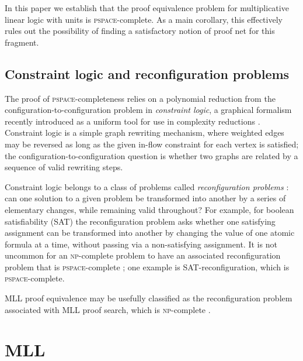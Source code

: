 \documentclass[conference]{IEEEtran}
\begin{document}
In this paper we establish that the proof equivalence problem for multiplicative linear logic with units is \textsc{pspace}-complete.
%
As a main corollary, this effectively rules out the possibility of finding a satisfactory notion of proof net for this fragment.



\subsection*{Constraint logic and reconfiguration problems}

The proof of \textsc{pspace}-completeness relies on a polynomial reduction from the configuration-to-configuration problem in
\emph{constraint logic}, a graphical formalism recently introduced as a uniform tool for use in complexity reductions \cite{Demaine-Hearn-2008}.
%
Constraint logic is a simple graph rewriting mechanism, where weighted edges may be reversed as long as the given in-flow constraint for each vertex is satisfied; the configuration-to-configuration question is whether two graphs are related by a sequence of valid rewriting steps.

Constraint logic belongs to a class of problems called \emph{reconfiguration problems} \cite{ReconfigurationProblems}: can one solution to a given problem be transformed into another by a series of elementary changes, while remaining valid throughout?
%
For example, for boolean satisfiability (SAT) the reconfiguration problem asks whether one satisfying assignment can be transformed into another by changing the value of one atomic formula at a time, without passing via a non-satisfying assignment.
%
It is not uncommon for an \textsc{np}-complete problem to have an associated reconfiguration problem that is \textsc{pspace}-complete \cite{ReconfigurationProblems}; one example is SAT-reconfiguration, which is \textsc{pspace}-complete.

MLL proof equivalence may be usefully classified as the reconfiguration problem associated with MLL proof search, which is \textsc{np}-complete \cite{Kanovich-1992}.


\section{MLL}
\end{document}
